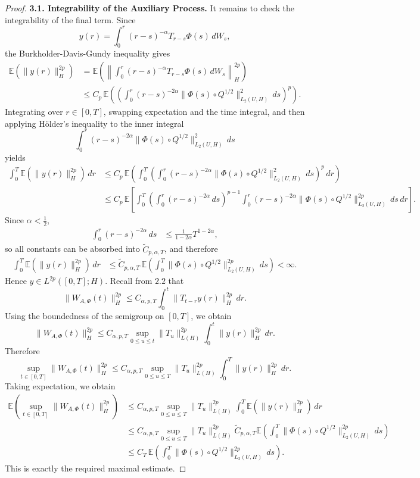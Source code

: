 \documentclass[11pt]{article}
\theoremstyle{definition}
\theoremstyle{remark}
\begin{document}
\begin{proof}
\noindent\textbf{3.1. Integrability of the Auxiliary Process.}
It remains to check the integrability of the final term. Since
\[
y(r)=\int_0^r (r-s)^{-\alpha}T_{r-s}\Phi(s)\,dW_s,
\]
the Burkholder-Davis-Gundy inequality gives
\begin{align*}
\mathbb E(\|y(r)\|_H^{2p})
&=
\mathbb E\!\left(\left\|\int_0^r (r-s)^{-\alpha}T_{r-s}\Phi(s)\,dW_s\right\|_H^{2p}\right) \\
&\le
C_p\,\mathbb E\!\left(\left(\int_0^r (r-s)^{-2\alpha}\|\Phi(s)\circ Q^{1/2}\|_{L_2(U,H)}^2\,ds\right)^p\right).
\end{align*}
Integrating over \(r\in[0,T]\), swapping expectation and the time integral, and then applying H\"older's inequality to the inner integral
\[
\int_0^r (r-s)^{-2\alpha}\|\Phi(s)\circ Q^{1/2}\|_{L_2(U,H)}^2\,ds
\]
yields
\begin{align*}
\int_0^T \mathbb E(\|y(r)\|_H^{2p})\,dr
&\le
C_p\,\mathbb E\!\left(\int_0^T \left(\int_0^r (r-s)^{-2\alpha}\|\Phi(s)\circ Q^{1/2}\|_{L_2(U,H)}^2\,ds\right)^p\,dr\right) \\
&\le
C_p\,\mathbb E\!\left[\int_0^T \left(\int_0^r (r-s)^{-2\alpha}\,ds\right)^{p-1}
\int_0^r (r-s)^{-2\alpha}\|\Phi(s)\circ Q^{1/2}\|_{L_2(U,H)}^{2p}\,ds\,dr\right].
\end{align*}
Since \(\alpha<\frac12\),
\begin{align*}
\int_0^r (r-s)^{-2\alpha}\,ds
&\le
\frac{1}{1-2\alpha}T^{1-2\alpha},
\end{align*}
so all constants can be absorbed into \(\widetilde C_{p,\alpha,T}\), and therefore
\begin{align*}
\int_0^T \mathbb E(\|y(r)\|_H^{2p})\,dr
&\le
\widetilde C_{p,\alpha,T}\,\mathbb E\!\left(\int_0^T \|\Phi(s)\circ Q^{1/2}\|_{L_2(U,H)}^{2p}\,ds\right)
<\infty.
\end{align*}
Hence \(y\in L^{2p}([0,T];H)\).
Recall from \(2.2\) that
\[
\|W_{A,\Phi}(t)\|_H^{2p}
\le
C_{\alpha,p,T}\int_0^t \|T_{t-r}y(r)\|_H^{2p}\,dr.
\]
Using the boundedness of the semigroup on \([0,T]\), we obtain
\[
\|W_{A,\Phi}(t)\|_H^{2p}
\le
C_{\alpha,p,T}\sup_{0\le u\le t}\|T_u\|_{L(H)}^{2p}\int_0^t \|y(r)\|_H^{2p}\,dr.
\]
Therefore
\[
\sup_{t\in[0,T]}\|W_{A,\Phi}(t)\|_H^{2p}
\le
C_{\alpha,p,T}\sup_{0\le u\le T}\|T_u\|_{L(H)}^{2p}\int_0^T \|y(r)\|_H^{2p}\,dr.
\]
Taking expectation, we obtain
\begin{align*}
\mathbb E\!\left(
\sup_{t\in[0,T]}
\|W_{A,\Phi}(t)\|_H^{2p}
\right)
&\le
C_{\alpha,p,T}\sup_{0\le u\le T}\|T_u\|_{L(H)}^{2p}\int_0^T \mathbb E(\|y(r)\|_H^{2p})\,dr \\
&\le
C_{\alpha,p,T}\sup_{0\le u\le T}\|T_u\|_{L(H)}^{2p}\widetilde C_{p,\alpha,T}
\mathbb E\!\left(\int_0^T \|\Phi(s)\circ Q^{1/2}\|_{L_2(U,H)}^{2p}\,ds\right) \\
&\le
C_T\,\mathbb E\!\left(\int_0^T \|\Phi(s)\circ Q^{1/2}\|_{L_2(U,H)}^{2p}\,ds\right).
\end{align*}
This is exactly the required maximal estimate.


\end{proof}
\end{document}
